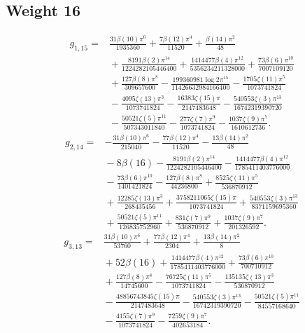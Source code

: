 \subsection*{Weight 16}
\begin{align*}g_{1,15}={}&\frac{31 \beta(10) \pi^{6}}{1935360}+\frac{7 \beta(12) \pi^{4}}{11520}+\frac{\beta(14) \pi^{2}}{48}\\
&{}+\frac{8191 \beta(2) \pi^{14}}{1224282105446400}+\frac{1414477 \beta(4) \pi^{12}}{5356234211328000}+\frac{73 \beta(6) \pi^{10}}{7007109120}\\
&{}+\frac{127 \beta(8) \pi^{8}}{309657600}- \frac{199360981 \log 2 \pi^{15}}{11426632984166400}- \frac{1705 \zeta(11) \pi^{5}}{1073741824}\\
&{}- \frac{4095 \zeta(13) \pi^{3}}{1073741824}- \frac{16383 \zeta(15) \pi}{2147483648}- \frac{540553 \zeta(3) \pi^{13}}{16742319390720}\\
&{}- \frac{50521 \zeta(5) \pi^{11}}{507343011840}- \frac{277 \zeta(7) \pi^{9}}{1073741824}- \frac{1037 \zeta(9) \pi^{7}}{1610612736}.\end{align*}
\begin{align*}g_{2,14}={}&- \frac{31 \beta(10) \pi^{6}}{215040}- \frac{77 \beta(12) \pi^{4}}{11520}- \frac{13 \beta(14) \pi^{2}}{48}\\
&{}- 8 \beta(16)- \frac{8191 \beta(2) \pi^{14}}{1224282105446400}- \frac{1414477 \beta(4) \pi^{12}}{1785411403776000}\\
&{}- \frac{73 \beta(6) \pi^{10}}{1401421824}- \frac{127 \beta(8) \pi^{8}}{44236800}+\frac{8525 \zeta(11) \pi^{5}}{536870912}\\
&{}+\frac{12285 \zeta(13) \pi^{3}}{268435456}+\frac{3758211065 \zeta(15) \pi}{1073741824}+\frac{540553 \zeta(3) \pi^{13}}{8371159695360}\\
&{}+\frac{50521 \zeta(5) \pi^{11}}{126835752960}+\frac{831 \zeta(7) \pi^{9}}{536870912}+\frac{1037 \zeta(9) \pi^{7}}{201326592}.\end{align*}
\begin{align*}g_{3,13}={}&\frac{31 \beta(10) \pi^{6}}{53760}+\frac{77 \beta(12) \pi^{4}}{2304}+\frac{13 \beta(14) \pi^{2}}{8}\\
&{}+52 \beta(16)+\frac{1414477 \beta(4) \pi^{12}}{1785411403776000}+\frac{73 \beta(6) \pi^{10}}{700710912}\\
&{}+\frac{127 \beta(8) \pi^{8}}{14745600}- \frac{76725 \zeta(11) \pi^{5}}{1073741824}- \frac{135135 \zeta(13) \pi^{3}}{536870912}\\
&{}- \frac{48856743845 \zeta(15) \pi}{2147483648}- \frac{540553 \zeta(3) \pi^{13}}{16742319390720}- \frac{50521 \zeta(5) \pi^{11}}{84557168640}\\
&{}- \frac{4155 \zeta(7) \pi^{9}}{1073741824}- \frac{7259 \zeta(9) \pi^{7}}{402653184}.\end{align*}
